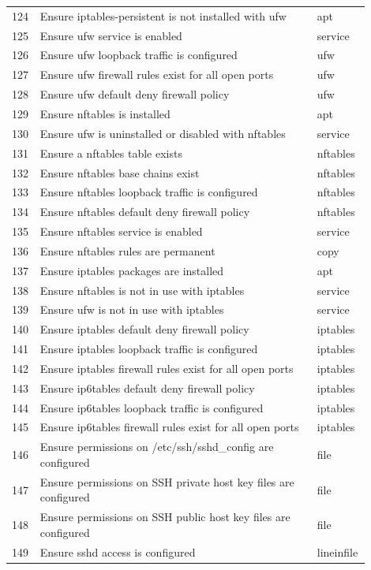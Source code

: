\begin{longtable}{|p{0.05\linewidth}|p{0.75\linewidth}|p{0.1\linewidth}|}
124 & Ensure iptables-persistent is not installed with ufw & apt \\
125 & Ensure ufw service is enabled & service \\
126 & Ensure ufw loopback traffic is configured & ufw \\
127 & Ensure ufw firewall rules exist for all open ports & ufw \\
128 & Ensure ufw default deny firewall policy & ufw \\
129 & Ensure nftables is installed & apt \\
130 & Ensure ufw is uninstalled or disabled with nftables & service \\
131 & Ensure a nftables table exists & nftables \\
132 & Ensure nftables base chains exist & nftables \\
133 & Ensure nftables loopback traffic is configured & nftables \\
134 & Ensure nftables default deny firewall policy & nftables \\
135 & Ensure nftables service is enabled & service \\
136 & Ensure nftables rules are permanent & copy \\
137 & Ensure iptables packages are installed & apt \\
138 & Ensure nftables is not in use with iptables & service \\
139 & Ensure ufw is not in use with iptables & service \\
140 & Ensure iptables default deny firewall policy & iptables \\
141 & Ensure iptables loopback traffic is configured & iptables \\
142 & Ensure iptables firewall rules exist for all open ports & iptables \\
143 & Ensure ip6tables default deny firewall policy & iptables \\
144 & Ensure ip6tables loopback traffic is configured & iptables \\
145 & Ensure ip6tables firewall rules exist for all open ports & iptables \\
146 & Ensure permissions on /etc/ssh/sshd\_config are configured & file \\
147 & Ensure permissions on SSH private host key files are configured & file \\
148 & Ensure permissions on SSH public host key files are configured & file \\
149 & Ensure sshd access is configured & lineinfile \\

\end{longtable}
